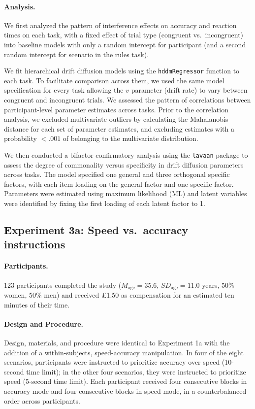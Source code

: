 \documentclass[pdflatex,sn-nature]{sn-jnl}
\begin{document}
\paragraph{Analysis.}
We first analyzed the pattern of interference effects on accuracy and reaction times on each task, with a fixed effect of trial type (congruent vs.\ incongruent) into baseline models with only a random intercept for participant (and a second random intercept for scenario in the rules task).

We fit hierarchical drift diffusion models using the \texttt{hddmRegressor} function to each task. To facilitate comparison across them, we used the same model specification for every task allowing the $v$ parameter (drift rate) to vary between congruent and incongruent trials. We assessed the pattern of correlations between participant-level parameter estimates across tasks. Prior to the correlation analysis, we excluded multivariate outliers by calculating the Mahalanobis distance for each set of parameter estimates, and excluding estimates with a probability $< .001$ of belonging to the multivariate distribution.

We then conducted a bifactor confirmatory analysis using the \texttt{lavaan} package\cite{ref49} to assess the degree of commonality versus specificity in drift diffusion parameters across tasks. The model specified one general and three orthogonal specific factors, with each item loading on the general factor and one specific factor. Parameters were estimated using maximum likelihood (ML) and latent variables were identified by fixing the first loading of each latent factor to 1.

\subsection{Experiment 3a: Speed vs.\ accuracy instructions}\label{subsec:exp3a}

\paragraph{Participants.}
123 participants completed the study ($M_\text{age} = 35.6$, $\mathit{SD}_\text{age} = 11.0$ years, 50\% women, 50\% men) and received £1.50 as compensation for an estimated ten minutes of their time.

\paragraph{Design and Procedure.}
Design, materials, and procedure were identical to Experiment 1a with the addition of a within-subjects, speed-accuracy manipulation. In four of the eight scenarios, participants were instructed to prioritize accuracy over speed (10-second time limit); in the other four scenarios, they were instructed to prioritize speed (5-second time limit). Each participant received four consecutive blocks in accuracy mode and four consecutive blocks in speed mode, in a counterbalanced order across participants.
\end{document}
